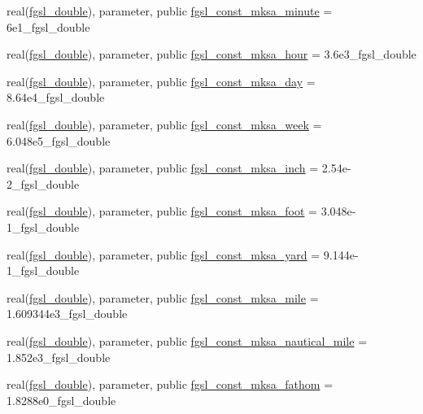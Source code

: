 \begin{DoxyCompactItemize}
\item 
real(\hyperlink{namespacefgsl_a9af5113378e0f000eb479d3f90196ddf}{fgsl\+\_\+double}), parameter, public \hyperlink{namespacefgsl_a5c0cc4ab0dc2be570d83ef0f9d2f4ba6}{fgsl\+\_\+const\+\_\+mksa\+\_\+minute} = 6e1\+\_\+fgsl\+\_\+double
\item 
real(\hyperlink{namespacefgsl_a9af5113378e0f000eb479d3f90196ddf}{fgsl\+\_\+double}), parameter, public \hyperlink{namespacefgsl_aa7d132341cda0d591f1452a894cf5855}{fgsl\+\_\+const\+\_\+mksa\+\_\+hour} = 3.\+6e3\+\_\+fgsl\+\_\+double
\item 
real(\hyperlink{namespacefgsl_a9af5113378e0f000eb479d3f90196ddf}{fgsl\+\_\+double}), parameter, public \hyperlink{namespacefgsl_af69acf253e04452510d9ec67efa458d2}{fgsl\+\_\+const\+\_\+mksa\+\_\+day} = 8.\+64e4\+\_\+fgsl\+\_\+double
\item 
real(\hyperlink{namespacefgsl_a9af5113378e0f000eb479d3f90196ddf}{fgsl\+\_\+double}), parameter, public \hyperlink{namespacefgsl_aecb67f391facbac682484e9d352dac5e}{fgsl\+\_\+const\+\_\+mksa\+\_\+week} = 6.\+048e5\+\_\+fgsl\+\_\+double
\item 
real(\hyperlink{namespacefgsl_a9af5113378e0f000eb479d3f90196ddf}{fgsl\+\_\+double}), parameter, public \hyperlink{namespacefgsl_a272689a26b0b7b5cd89f28713aa251d4}{fgsl\+\_\+const\+\_\+mksa\+\_\+inch} = 2.\+54e-\/2\+\_\+fgsl\+\_\+double
\item 
real(\hyperlink{namespacefgsl_a9af5113378e0f000eb479d3f90196ddf}{fgsl\+\_\+double}), parameter, public \hyperlink{namespacefgsl_acff74ed42941dc6324409ba0eee894ee}{fgsl\+\_\+const\+\_\+mksa\+\_\+foot} = 3.\+048e-\/1\+\_\+fgsl\+\_\+double
\item 
real(\hyperlink{namespacefgsl_a9af5113378e0f000eb479d3f90196ddf}{fgsl\+\_\+double}), parameter, public \hyperlink{namespacefgsl_a822a621129f787917e82b140d0814b72}{fgsl\+\_\+const\+\_\+mksa\+\_\+yard} = 9.\+144e-\/1\+\_\+fgsl\+\_\+double
\item 
real(\hyperlink{namespacefgsl_a9af5113378e0f000eb479d3f90196ddf}{fgsl\+\_\+double}), parameter, public \hyperlink{namespacefgsl_a6336ad4316ac012f6ae1ba2c951ec520}{fgsl\+\_\+const\+\_\+mksa\+\_\+mile} = 1.\+609344e3\+\_\+fgsl\+\_\+double
\item 
real(\hyperlink{namespacefgsl_a9af5113378e0f000eb479d3f90196ddf}{fgsl\+\_\+double}), parameter, public \hyperlink{namespacefgsl_a035a322332ff494af9c3ecfb5dca6125}{fgsl\+\_\+const\+\_\+mksa\+\_\+nautical\+\_\+mile} = 1.\+852e3\+\_\+fgsl\+\_\+double
\item 
real(\hyperlink{namespacefgsl_a9af5113378e0f000eb479d3f90196ddf}{fgsl\+\_\+double}), parameter, public \hyperlink{namespacefgsl_a1b3e809c97882aeaebf2e325079f38a3}{fgsl\+\_\+const\+\_\+mksa\+\_\+fathom} = 1.\+8288e0\+\_\+fgsl\+\_\+double

\end{DoxyCompactItemize}
